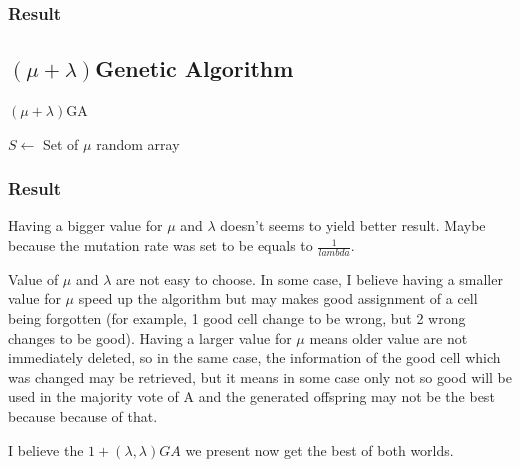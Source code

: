 \documentclass[12pt]{article}
\theoremstyle{definition}
\theoremstyle{plain}
\theoremstyle{remark}
\begin{document}
\subsubsection{Result}


\subsection{$(\mu +\lambda)$Genetic Algorithm}

\begin{algorithm}[H]
	\caption{$(\mu+\lambda)$GA}
	$S \leftarrow$ Set of $\mu$ random array\\
\end{algorithm}

\subsubsection{Result}


Having a bigger value for $\mu$ and $\lambda$ doesn't seems to yield better result. Maybe because the mutation rate was set to be equals to $\frac{1}{lambda}$.

Value of $\mu$ and $\lambda$ are not easy to choose. In some case, I believe having a smaller value for $\mu$ speed up the algorithm but may makes good assignment of a cell being forgotten (for example, 1 good cell change to be wrong, but 2 wrong changes to be good). Having a larger value for $\mu$ means older value are not immediately deleted, so in the same case, the information of the good cell which was changed may be retrieved, but it means in some case only not so good will be used in the majority vote of A and the generated offspring may not be the best because because of that.

I believe the $1 + (\lambda, \lambda)GA$ we present now get the best of both worlds.
\end{document}
